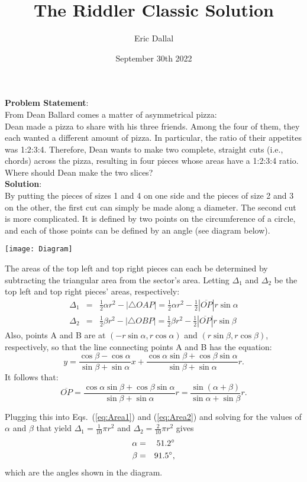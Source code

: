 \documentclass[10pt,a4paper]{article}
\title{The Riddler Classic Solution}
\date{September 30th 2022}
\author{Eric Dallal}
\begin{document}
\maketitle
\textbf{Problem Statement}:\\

From Dean Ballard comes a matter of asymmetrical pizza:\\

Dean made a pizza to share with his three friends. Among the four of them, they each wanted a different amount of pizza. In particular, the ratio of their appetites was 1:2:3:4. Therefore, Dean wants to make two complete, straight cuts (i.e., chords) across the pizza, resulting in four pieces whose areas have a 1:2:3:4 ratio.\\

Where should Dean make the two slices?\\

\textbf{Solution}:\\
By putting the pieces of sizes 1 and 4 on one side and the pieces of size 2 and 3 on the other, the first cut can simply be made along a diameter. The second cut is more complicated. It is defined by two points on the circumference of a circle, and each of those points can be defined by an angle (see diagram below).

\texttt{[image: Diagram]}

The areas of the top left and top right pieces can each be determined by subtracting the triangular area from the sector's area. Letting $\Delta_1$ and $\Delta_2$ be the top left and top right pieces' areas, respectively:
\begin{eqnarray}
\Delta_1 & = & \frac{1}{2}\alpha r^2 - |\triangle OAP| = \frac{1}{2}\alpha r^2 - \frac{1}{2}|\overline{OP}|r\sin\alpha \label{eq:Area1}\\
\Delta_2 & = & \frac{1}{2}\beta r^2 - |\triangle OBP| =\frac{1}{2}\beta r^2 - \frac{1}{2}|\overline{OP}|r\sin\beta \label{eq:Area2}
\end{eqnarray}
Also, points A and B are at $(-r\sin\alpha, r\cos\alpha)$ and $(r\sin\beta, r\cos\beta)$, respectively, so that the line connecting points A and B has the equation:
\begin{equation}
y = \frac{\cos\beta - \cos\alpha}{\sin\beta + \sin\alpha}x + \frac{\cos\alpha\sin\beta + \cos\beta\sin\alpha}{\sin\beta + \sin\alpha}r.
\end{equation}
It follows that:
\begin{equation}
\overline{OP} = \frac{\cos\alpha\sin\beta + \cos\beta\sin\alpha}{\sin\beta + \sin\alpha}r = \frac{\sin(\alpha + \beta)}{\sin\alpha + \sin\beta}r.
\end{equation}

Plugging this into Eqs.~(\ref{eq:Area1}) and (\ref{eq:Area2}) and solving for the values of $\alpha$ and $\beta$ that yield $\Delta_1 = \frac{1}{10}\pi r^2$ and $\Delta_2 = \frac{2}{10}\pi r^2$ gives
\begin{eqnarray*}
\alpha & = & 51.2\degree\\
\beta & = & 91.5\degree,
\end{eqnarray*}
which are the angles shown in the diagram.
\end{document}
